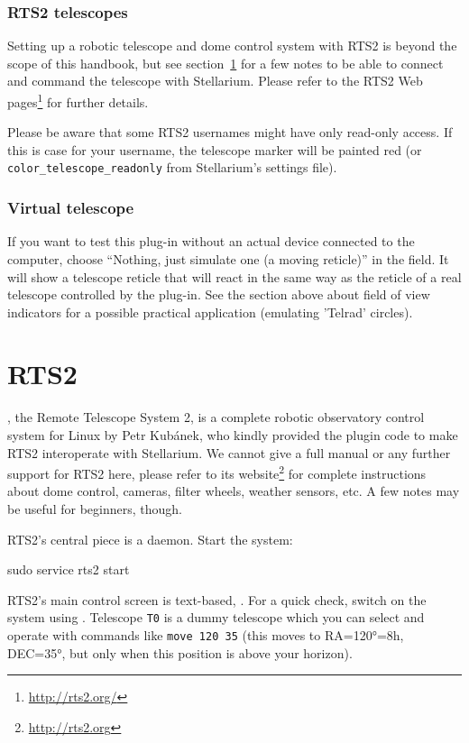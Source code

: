 \subsubsection{RTS2 telescopes}
Setting up a robotic telescope and dome control system with RTS2 
is beyond the scope of this handbook, but see section~\ref{sec:plugins:TelescopeControl:RTS2} 
for a few notes to be able to connect and command the telescope with Stellarium.
Please refer to the RTS2 Web pages\footnote{\url{http://rts2.org/}} for further details.

Please be aware that some RTS2 usernames might have only read-only access. If this is
case for your username, the telescope marker will be painted red (or
\texttt{color\_telescope\_readonly} from Stellarium's settings file).

\subsubsection{Virtual telescope}
If you want to test this plug-in without an actual device connected to
the computer, choose ``Nothing, just simulate one (a moving reticle)'' in
the  field. It will show a telescope reticle
that will react in the same way as the reticle of a real telescope
controlled by the plug-in.  See the section above about field of view
indicators for a possible practical application (emulating 'Telrad'
circles).  



\section{RTS2}
\label{sec:plugins:TelescopeControl:RTS2}

, the Remote Telescope System 2, is a complete robotic observatory control system for Linux 
by Petr Kub\'{a}nek, who kindly provided the plugin code to make RTS2 interoperate with Stellarium.
We cannot give a full manual or any further support for RTS2 here, please refer to its website\footnote{\url{http://rts2.org}} 
for complete instructions about dome control, cameras, filter wheels, weather sensors, etc. 
A few notes may be useful for beginners, though. 

RTS2's central piece is a daemon. Start the system:
\begin{commands}
sudo service rts2 start
\end{commands}
RTS2's main control screen is text-based, . For a quick check, switch on the system using . 
Telescope \texttt{T0} is a dummy telescope which you can select and operate with commands like \texttt{move 120 35} 
(this moves to RA=120°=8h, DEC=35°, but only when this position is above your horizon).

